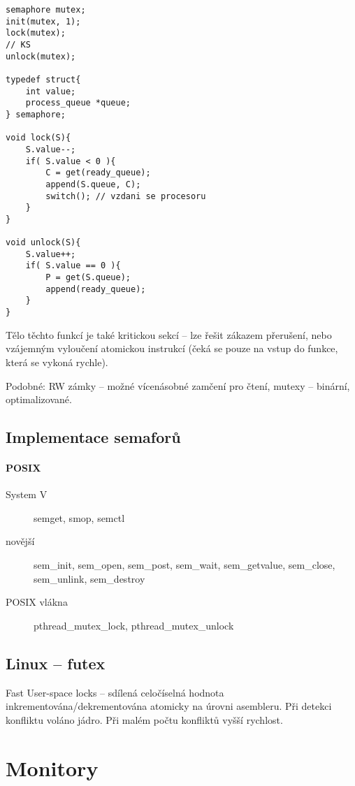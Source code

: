 \documentclass[a4wide]{report}
\begin{document}
\begin{lstlisting}
semaphore mutex;
init(mutex, 1);
lock(mutex);
// KS
unlock(mutex);

typedef struct{
	int value;
	process_queue *queue;
} semaphore;

void lock(S){
	S.value--;
	if( S.value < 0 ){
		C = get(ready_queue);
		append(S.queue, C);
		switch(); // vzdani se procesoru
	}
}

void unlock(S){
	S.value++;
	if( S.value == 0 ){
		P = get(S.queue);
		append(ready_queue);
	}
}
\end{lstlisting}

Tělo těchto funkcí je také kritickou sekcí -- lze řešit zákazem přerušení, nebo vzájemným vyloučení atomickou instrukcí (čeká se pouze na vstup do funkce, která se vykoná rychle).

Podobné: RW zámky -- možné vícenásobné zamčení pro čtení, mutexy -- binární, optimalizované.


\subsection{Implementace semaforů}

\paragraph{POSIX}
\begin{description}
	\item[System V] semget, smop, semctl 
	\item[novější] sem\_init, sem\_open, sem\_post, sem\_wait, sem\_getvalue, sem\_close, sem\_unlink, sem\_destroy
	\item[POSIX vlákna] pthread\_mutex\_lock, pthread\_mutex\_unlock
\end{description}

\subsection{Linux -- futex}

Fast User-space locks -- sdílená celočíselná hodnota inkrementována/dekrementována atomicky na úrovni asembleru. Při detekci konfliktu voláno jádro. Při malém počtu konfliktů vyšší rychlost.

\section{Monitory}
\end{document}
